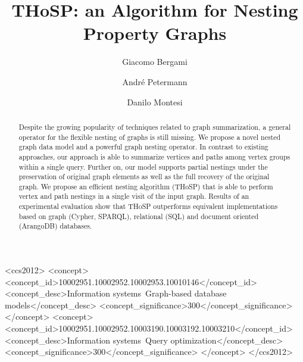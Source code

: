 
\begin{abstract}
  Despite the growing popularity of techniques related to graph summarization, a general operator for the flexible nesting of graphs is still missing.
  We propose a novel nested graph data model and a powerful graph nesting operator. In contrast to existing approaches, our approach is able to summarize vertices and paths among vertex groups within a single query. Further on, our model supports partial nestings under the preservation of original graph elements as well as the full recovery of the original graph. We propose an efficient nesting algorithm (THoSP) that is able to perform vertex and path nestings in a single visit of the input graph. Results of an experimental evaluation show that THoSP outperforms equivalent implementations based on graph (Cypher, SPARQL), relational (SQL) and document oriented (ArangoDB) databases.
\end{abstract}


\fancyhead{}
\title{THoSP: an Algorithm for Nesting Property Graphs}
\author{Giacomo Bergami}

\author{André Petermann}

\author{Danilo Montesi}
\begin{CCSXML}
	<ccs2012>
	<concept>
	<concept_id>10002951.10002952.10002953.10010146</concept_id>
	<concept_desc>Information systems~Graph-based database models</concept_desc>
	<concept_significance>300</concept_significance>
	</concept>
	<concept>
	<concept_id>10002951.10002952.10003190.10003192.10003210</concept_id>
	<concept_desc>Information systems~Query optimization</concept_desc>
	<concept_significance>300</concept_significance>
	</concept>
	</ccs2012>
\end{CCSXML}


\fancyhead{}
\maketitle








 
\appendix


